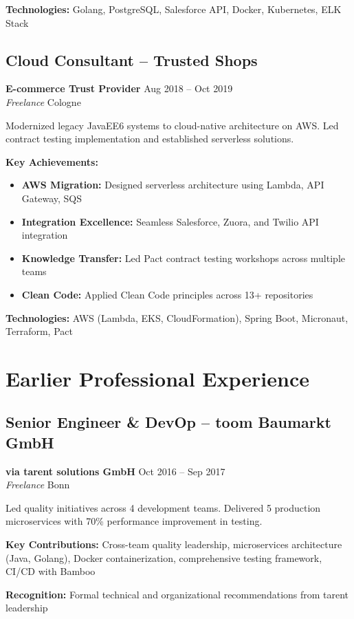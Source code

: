 \documentclass[11pt,a4paper]{article}
\newcommand{\role}[4]{\textbf{#1} \hfill #2 \\ \textit{#3} \hfill #4}
\begin{document}
\textbf{Technologies:} Golang, PostgreSQL, Salesforce API, Docker, Kubernetes, ELK Stack

\subsection{Cloud Consultant -- Trusted Shops}
\role{E-commerce Trust Provider}{Aug 2018 -- Oct 2019}{Freelance}{Cologne}

Modernized legacy JavaEE6 systems to cloud-native architecture on AWS. Led contract testing implementation and established serverless solutions.

\textbf{Key Achievements:}
\begin{itemize}
\item \textbf{AWS Migration:} Designed serverless architecture using Lambda, API Gateway, SQS
\item \textbf{Integration Excellence:} Seamless Salesforce, Zuora, and Twilio API integration
\item \textbf{Knowledge Transfer:} Led Pact contract testing workshops across multiple teams
\item \textbf{Clean Code:} Applied Clean Code principles across 13+ repositories
\end{itemize}

\textbf{Technologies:} AWS (Lambda, EKS, CloudFormation), Spring Boot, Micronaut, Terraform, Pact

\newpage

\section{Earlier Professional Experience}

\subsection{Senior Engineer \& DevOp -- toom Baumarkt GmbH}
\role{via tarent solutions GmbH}{Oct 2016 -- Sep 2017}{Freelance}{Bonn}

Led quality initiatives across 4 development teams. Delivered 5 production microservices with 70\% performance improvement in testing.

\textbf{Key Contributions:} Cross-team quality leadership, microservices architecture (Java, Golang), Docker containerization, comprehensive testing framework, CI/CD with Bamboo

\textbf{Recognition:} Formal technical and organizational recommendations from tarent leadership
\end{document}
